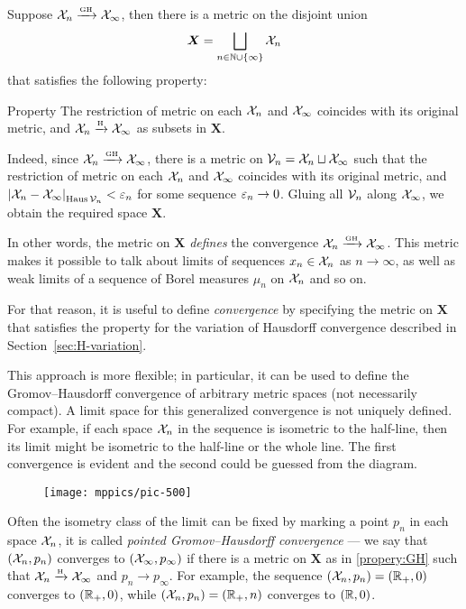 Suppose $\mathcal{X}_n\xrightarrow{\mbox{\tiny\rm GH}} \mathcal{X}_\infty$, then there is a metric on the disjoint union 
\[\bm{X}=\bigsqcup_{n\in \mathbb{N}\cup\{\infty\}} \mathcal{X}_n\] 
that satisfies the following property:

\begin{thm}{Property}\label{propery:GH}
The restriction of metric on each $\mathcal{X}_n$ and $\mathcal{X}_\infty$ coincides with its original metric, 
and $\mathcal{X}_n\xrightarrow{\mbox{\tiny\rm H}} \mathcal{X}_\infty$ as subsets in $\bm{X}$.
\end{thm}

Indeed, since $\mathcal{X}_n\xrightarrow{\mbox{\tiny\rm GH}} \mathcal{X}_\infty$, there is a metric on $\mathcal{V}_n=\mathcal{X}_n\sqcup \mathcal{X}_\infty$ such that the restriction of metric on each $\mathcal{X}_n$ and $\mathcal{X}_\infty$ coincides with its original metric, and $\dist{\spc{X}_n}{\spc{X}_\infty}{\Haus\spc{V}_n}<\eps_n$ for some sequence $\varepsilon_n\to 0$.
Gluing all $\mathcal{V}_n$ along $\mathcal{X}_\infty$, we obtain the required space $\bm{X}$.

In other words, the metric on $\bm{X}$ \textit{defines} the convergence $\spc{X}_n\z\GHto \spc{X}_\infty$.
This metric makes it possible to talk about limits of sequences $x_n\in \mathcal{X}_n$ as $n\to\infty$, as well as weak limits of a sequence of Borel measures $\mu_n$ on $\mathcal{X}_n$ and so on.

For that reason, it is useful to define \emph{convergence} by specifying the metric on $\bm{X}$ that satisfies the property
for the variation of Hausdorff convergence described in Section~\ref{sec:H-variation}.

This approach is more flexible;
in particular, it can be used to define the Gromov--Hausdorff convergence of arbitrary metric spaces (not necessarily compact).
A limit space for this generalized convergence is not uniquely defined.
For example, if each space $\mathcal{X}_n$ in the sequence is isometric to the half-line, then its limit might be isometric to the half-line or the whole line.
The first convergence is evident and the second could be guessed from the diagram.

\begin{figure}[ht!]
\vskip-0mm
\centering
\texttt{[image: mppics/pic-500]}
\end{figure}

Often the isometry class of the limit can be fixed by marking a point $p_n$ in each space $\mathcal{X}_n$, it is called \emph{pointed Gromov--Hausdorff convergence} --- we say that $(\mathcal{X}_n,p_n)$ converges to $(\mathcal{X}_\infty,p_\infty)$ if there is a metric on $\bm{X}$ as in \ref{propery:GH} such that $\mathcal{X}_n\xrightarrow{\mbox{\tiny\rm H}} \mathcal{X}_\infty$ and $p_n\to p_\infty$.
For example, the sequence $(\mathcal{X}_n,p_n)=(\mathbb{R}_+,0)$ converges to $(\mathbb{R}_+,0)$, while $(\mathcal{X}_n,p_n)=(\mathbb{R}_+,n)$ converges to $(\mathbb{R},0)$.

